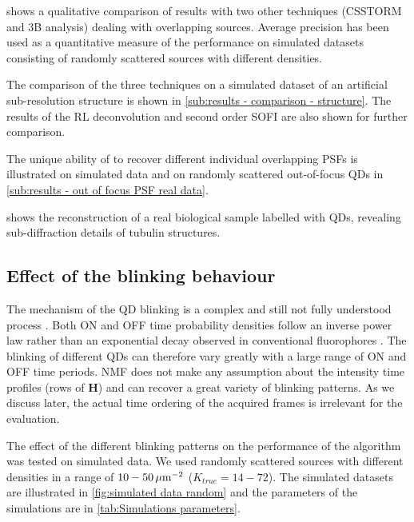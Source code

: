  shows a qualitative comparison of \inmf{} results with two other techniques (CSSTORM and 3B analysis) dealing with overlapping sources. Average precision has been used as a quantitative measure of the performance on simulated datasets consisting of randomly scattered sources with different densities.

The comparison of the three techniques on a simulated dataset of an artificial sub-resolution structure is shown in \autoref{sub:results - comparison - structure}. The results of the RL deconvolution and second order SOFI are also shown for further comparison. 

The unique ability of \inmf{} to recover different individual overlapping PSFs is illustrated on simulated data and on randomly scattered out-of-focus QDs in \autoref{sub:results - out of focus PSF real data}.

 shows the \inmf{} reconstruction of a real biological sample labelled with QDs, revealing sub-diffraction details of tubulin structures.


\subsection{Effect of the blinking behaviour \label{sub:results - blinking behaviour}}
The mechanism of the QD blinking is a complex and still not fully understood process \cite{Stefani2009}. Both ON and OFF time probability densities follow an inverse power law rather than an exponential decay observed in conventional fluorophores \cite{Kuno2001}. The blinking of different QDs can therefore vary greatly with a large range of ON and OFF time periods. NMF does not make any assumption about the intensity time profiles (rows of $\bm{H}$) and can recover a great variety of blinking patterns. As we discuss later, the actual time ordering of the acquired frames is irrelevant for the \inmf{} evaluation. 

The effect of the different blinking patterns on the performance of the \inmf{} algorithm was tested on simulated data. We used randomly scattered sources with different densities in a range of $10-50\, \mathrm{\mu m}^{-2}$ ($K_{true}=14-72$). The simulated datasets are illustrated in \autoref{fig:simulated data random} and the parameters of the simulations are in \autoref{tab:Simulations parameters}. 

